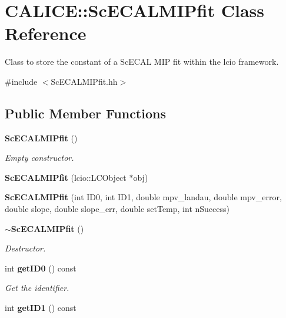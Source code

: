 \section{CALICE::ScECALMIPfit Class Reference}
\label{classCALICE_1_1ScECALMIPfit}


Class to store the constant of a ScECAL MIP fit within the lcio framework.  


{\ttfamily \#include $<$ScECALMIPfit.hh$>$}\subsection*{Public Member Functions}
\begin{DoxyCompactItemize}
\item 
{\bf ScECALMIPfit} ()\label{classCALICE_1_1ScECALMIPfit_a26510de92557f5e3c85ff4ed4d9fa708}

\begin{DoxyCompactList}\small\item\em Empty constructor. \item\end{DoxyCompactList}\item 
{\bfseries ScECALMIPfit} (lcio::LCObject $\ast$obj)\label{classCALICE_1_1ScECALMIPfit_acd5b5a6ed9c6f9adcce0f9cc9057578e}

\item 
{\bfseries ScECALMIPfit} (int ID0, int ID1, double mpv\_\-landau, double mpv\_\-error, double slope, double slope\_\-err, double setTemp, int nSuccess)\label{classCALICE_1_1ScECALMIPfit_a5efbc5b0fc0f418b071ec5ab079a0c3e}

\item 
{\bf $\sim$ScECALMIPfit} ()\label{classCALICE_1_1ScECALMIPfit_a6bab7edeb418297587dc05912acf23b9}

\begin{DoxyCompactList}\small\item\em Destructor. \item\end{DoxyCompactList}\item 
int {\bf getID0} () const \label{classCALICE_1_1ScECALMIPfit_a506aa0f2441e5bbf73c185aa0440c74e}

\begin{DoxyCompactList}\small\item\em Get the identifier. \item\end{DoxyCompactList}\item 
int {\bfseries getID1} () const \label{classCALICE_1_1ScECALMIPfit_a0adbccb9d5c58f59550d210cf57b85ff}


\end{DoxyCompactItemize}
